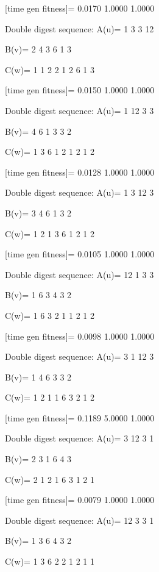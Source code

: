 [time gen fitness]=
    0.0170    1.0000    1.0000

Double digest sequence:
A(u)=
     1     3     3    12

B(v)=
     2     4     3     6     1     3

C(w)=
     1     1     2     2     1     2     6     1     3

[time gen fitness]=
    0.0150    1.0000    1.0000

Double digest sequence:
A(u)=
     1    12     3     3

B(v)=
     4     6     1     3     3     2

C(w)=
     1     3     6     1     2     1     2     1     2

[time gen fitness]=
    0.0128    1.0000    1.0000

Double digest sequence:
A(u)=
     1     3    12     3

B(v)=
     3     4     6     1     3     2

C(w)=
     1     2     1     3     6     1     2     1     2

[time gen fitness]=
    0.0105    1.0000    1.0000

Double digest sequence:
A(u)=
    12     1     3     3

B(v)=
     1     6     3     4     3     2

C(w)=
     1     6     3     2     1     1     2     1     2

[time gen fitness]=
    0.0098    1.0000    1.0000

Double digest sequence:
A(u)=
     3     1    12     3

B(v)=
     1     4     6     3     3     2

C(w)=
     1     2     1     1     6     3     2     1     2

[time gen fitness]=
    0.1189    5.0000    1.0000

Double digest sequence:
A(u)=
     3    12     3     1

B(v)=
     2     3     1     6     4     3

C(w)=
     2     1     2     1     6     3     1     2     1

[time gen fitness]=
    0.0079    1.0000    1.0000

Double digest sequence:
A(u)=
    12     3     3     1

B(v)=
     1     3     6     4     3     2

C(w)=
     1     3     6     2     2     1     2     1     1

